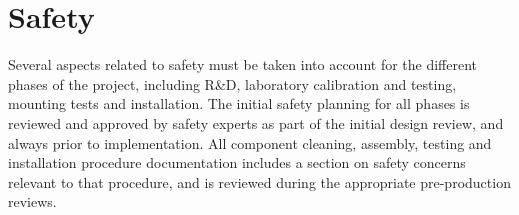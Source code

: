 \section{Safety}
\label{sec:fdgen-slow-cryo-safety}


Several aspects related to safety must be taken into account for the different phases of the  project, including R\&D, laboratory calibration and testing, mounting tests and installation. 
The initial safety planning for all phases is reviewed and approved by safety experts as part of the initial design review, and always prior to implementation. 
All component cleaning, assembly, testing  and installation procedure documentation includes a section on safety concerns
relevant to that procedure, and is reviewed during the appropriate pre-production reviews.


